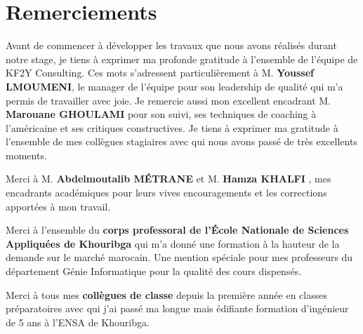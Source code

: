 \chapter*{Remerciements}
Avant de commencer à développer les travaux que nous avons réalisés durant notre stage, je tiens à exprimer ma profonde gratitude à l’ensemble de l’équipe de KF2Y Consulting. Ces mots s’adressent particulièrement à M. \textbf{Youssef LMOUMENI}, le manager de l’équipe pour son leadership de qualité qui m’a permis de travailler avec joie. Je remercie aussi mon excellent encadrant M. \textbf{Marouane GHOULAMI} pour son suivi, ses techniques de coaching à l’américaine et ses critiques constructives. Je tiens à exprimer ma gratitude à l’ensemble de mes collègues stagiaires avec qui nous avons passé de très excellents moments. 


Merci à M. \textbf{Abdelmoutalib MÉTRANE} et M. \textbf{Hamza KHALFI} , mes encadrants académiques pour leurs vives encouragements et les corrections apportées à mon travail.


Merci à l’ensemble du \textbf{corps professoral de l’École Nationale de Sciences Appliquées de Khouribga} qui m’a donné une formation à la hauteur de la demande sur le marché marocain. Une mention spéciale pour mes professeurs du département Génie Informatique pour la qualité des cours dispensés.


Merci à tous mes \textbf{collègues de classe} depuis la première année en classes préparatoires avec qui j’ai passé ma longue mais édifiante formation d’ingénieur de 5 ans à l’ENSA de Khouribga. 
